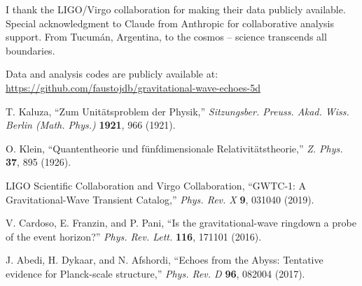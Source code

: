 \documentclass[twocolumn,10pt]{revtex4-2}
\begin{document}
I thank the LIGO/Virgo collaboration for making their data publicly available. Special acknowledgment to Claude from Anthropic for collaborative analysis support. From Tucum\'an, Argentina, to the cosmos -- science transcends all boundaries.

Data and analysis codes are publicly available at: \url{https://github.com/faustojdb/gravitational-wave-echoes-5d}

\begin{thebibliography}{99}

 T. Kaluza, ``Zum Unit\"atsproblem der Physik,'' \textit{Sitzungsber. Preuss. Akad. Wiss. Berlin (Math. Phys.)} \textbf{1921}, 966 (1921).

 O. Klein, ``Quantentheorie und f\"unfdimensionale Relativit\"atstheorie,'' \textit{Z. Phys.} \textbf{37}, 895 (1926).

 LIGO Scientific Collaboration and Virgo Collaboration, ``GWTC-1: A Gravitational-Wave Transient Catalog,'' \textit{Phys. Rev. X} \textbf{9}, 031040 (2019).

 V. Cardoso, E. Franzin, and P. Pani, ``Is the gravitational-wave ringdown a probe of the event horizon?'' \textit{Phys. Rev. Lett.} \textbf{116}, 171101 (2016).

 J. Abedi, H. Dykaar, and N. Afshordi, ``Echoes from the Abyss: Tentative evidence for Planck-scale structure,'' \textit{Phys. Rev. D} \textbf{96}, 082004 (2017).

\end{thebibliography}
\end{document}
